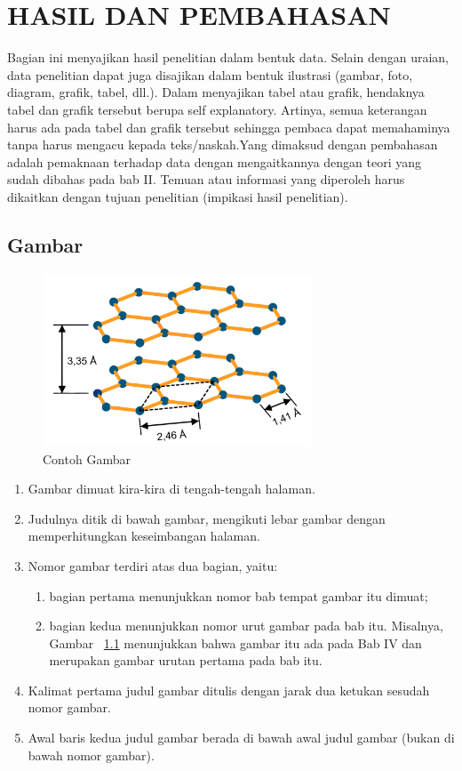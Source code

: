 \chapter{HASIL DAN PEMBAHASAN}

Bagian ini menyajikan hasil penelitian dalam bentuk data. Selain dengan uraian, data penelitian dapat juga disajikan dalam bentuk ilustrasi (gambar, foto, diagram, grafik, tabel, dll.). Dalam menyajikan tabel atau grafik, hendaknya tabel dan grafik tersebut berupa self explanatory. Artinya, semua keterangan harus ada pada tabel dan grafik tersebut sehingga pembaca dapat memahaminya tanpa harus mengacu kepada teks/naskah.Yang dimaksud dengan pembahasan adalah pemaknaan terhadap data dengan mengaitkannya dengan teori yang sudah dibahas pada bab II. Temuan atau informasi yang diperoleh harus dikaitkan dengan tujuan penelitian (impikasi hasil penelitian).

\section{Gambar}

\begin{figure}[H]
  \centering
  \includegraphics[width=8cm]{Gambar/blg.pdf}
  \caption{Contoh Gambar}
  \label{fig:blg}
\end{figure}

\begin{enumerate}
  \item Gambar dimuat kira-kira di tengah-tengah halaman.
  \item Judulnya ditik di bawah gambar, mengikuti lebar gambar dengan memperhitungkan keseimbangan halaman.
  \item Nomor gambar terdiri atas dua bagian, yaitu:
  \begin{enumerate}[label=(\alph*)]
    \item bagian pertama menunjukkan nomor bab tempat gambar itu dimuat;
    \item bagian kedua menunjukkan nomor urut gambar pada bab itu. Misalnya, Gambar  ~\ref{fig:blg} menunjukkan bahwa gambar itu ada pada Bab IV dan merupakan gambar urutan pertama pada bab itu.
  \end{enumerate}
  \item Kalimat pertama judul gambar ditulis dengan jarak dua ketukan sesudah nomor gambar.
  \item Awal baris kedua judul gambar berada di bawah awal judul gambar (bukan di bawah nomor gambar).
\end{enumerate}

